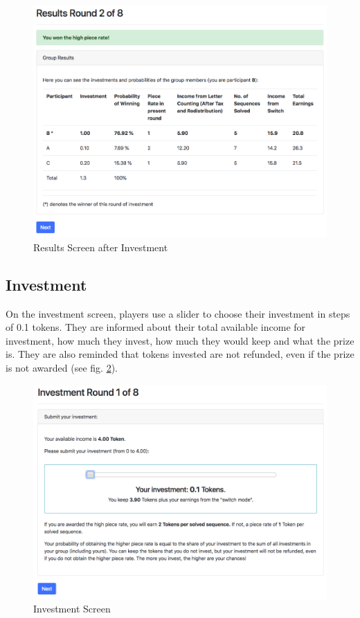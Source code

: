     \begin{figure}
        \centering
        \includegraphics[width=\textwidth]{graphs/screen_results.png}
        \caption{Results Screen after Investment}
        \label{fig:screen_results}
    \end{figure}
    
    \subsection{Investment}
    
    On the investment screen, players use a slider to choose their investment in steps of 0.1 tokens. They are informed about their total available income for investment, how much they invest, how much they would keep and what the prize is. They are also reminded that tokens invested are not refunded, even if the prize is not awarded (see fig. \ref{fig:screen_invest}).
    
    \begin{figure}
        \centering
        \includegraphics[width=\textwidth]{graphs/screen_invest.png}
        \caption{Investment Screen}
        \label{fig:screen_invest}
    \end{figure}
    
